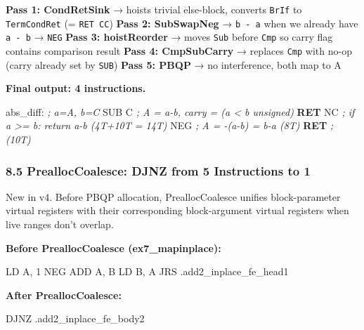 \documentclass[
  11pt,
]{article}
\newenvironment{Shaded}{}{}
\newcommand{\BuiltInTok}[1]{\textcolor[rgb]{0.00,0.50,0.00}{#1}}
\newcommand{\CommentTok}[1]{\textcolor[rgb]{0.38,0.63,0.69}{\textit{#1}}}
\newcommand{\ControlFlowTok}[1]{\textcolor[rgb]{0.00,0.44,0.13}{\textbf{#1}}}
\newcommand{\DecValTok}[1]{\textcolor[rgb]{0.25,0.63,0.44}{#1}}
\newcommand{\FunctionTok}[1]{\textcolor[rgb]{0.02,0.16,0.49}{#1}}
\newcommand{\NormalTok}[1]{#1}
\newcommand{\OperatorTok}[1]{\textcolor[rgb]{0.40,0.40,0.40}{#1}}
\begin{document}
\textbf{Pass 1: CondRetSink} → hoists trivial else-block, converts
\texttt{BrIf} to \texttt{TermCondRet} (= \texttt{RET\ CC}) \textbf{Pass
2: SubSwapNeg} → \texttt{b\ -\ a} when we already have \texttt{a\ -\ b}
→ \texttt{NEG} \textbf{Pass 3: hoistReorder} → moves \texttt{Sub} before
\texttt{Cmp} so carry flag contains comparison result \textbf{Pass 4:
CmpSubCarry} → replaces \texttt{Cmp} with no-op (carry already set by
\texttt{SUB}) \textbf{Pass 5: PBQP} → no interference, both map to A

\textbf{Final output: 4 instructions.}

\begin{Shaded}
\begin{Highlighting}[]
\FunctionTok{abs\_diff:}   \CommentTok{; a=A, b=C}
    \BuiltInTok{SUB}\NormalTok{ C       }\CommentTok{; A = a{-}b, carry = (a \textless{} b unsigned)}
    \ControlFlowTok{RET}\NormalTok{ NC      }\CommentTok{; if a \textgreater{}= b: return a{-}b (4T+10T = 14T)}
    \BuiltInTok{NEG}         \CommentTok{; A = {-}(a{-}b) = b{-}a  (8T)}
    \ControlFlowTok{RET}         \CommentTok{; (10T)}
\end{Highlighting}
\end{Shaded}

\subsubsection{8.5 PreallocCoalesce: DJNZ from 5 Instructions to
1}\label{prealloccoalesce-djnz-from-5-instructions-to-1}

New in v4. Before PBQP allocation, PreallocCoalesce unifies
block-parameter virtual registers with their corresponding
block-argument virtual registers when live ranges don't overlap.

\textbf{Before PreallocCoalesce (ex7\_mapinplace):}

\begin{Shaded}
\begin{Highlighting}[]
\NormalTok{    LD A}\OperatorTok{,} \DecValTok{1}
    \BuiltInTok{NEG}
    \BuiltInTok{ADD}\NormalTok{ A}\OperatorTok{,}\NormalTok{ B}
\NormalTok{    LD B}\OperatorTok{,}\NormalTok{ A}
\NormalTok{    JRS }\OperatorTok{.}\NormalTok{add2\_inplace\_fe\_head1}
\end{Highlighting}
\end{Shaded}

\textbf{After PreallocCoalesce:}

\begin{Shaded}
\begin{Highlighting}[]
\NormalTok{    DJNZ }\OperatorTok{.}\NormalTok{add2\_inplace\_fe\_body2}
\end{Highlighting}
\end{Shaded}
\end{document}
